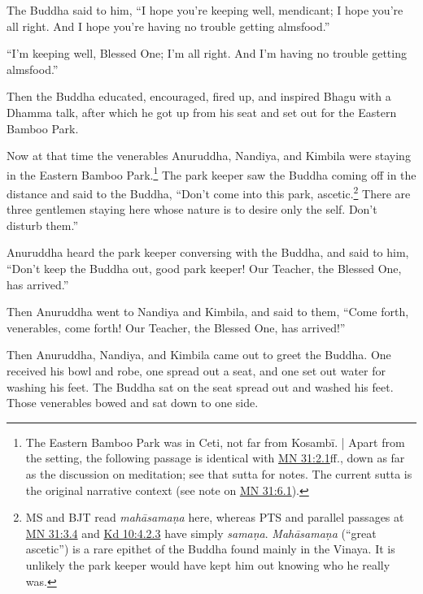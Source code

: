 \documentclass[12pt,openany]{book}%
\begin{document}
The Buddha said to him, “I hope you’re keeping well, mendicant; I hope you’re all right. And I hope you’re having no trouble getting almsfood.” 

“I’m keeping well, Blessed One; I’m all right. And I’m having no trouble getting almsfood.” 

Then the Buddha educated, encouraged, fired up, and inspired Bhagu with a Dhamma talk, after which he got up from his seat and set out for the Eastern Bamboo Park. 

Now at that time the venerables Anuruddha, Nandiya, and Kimbila were staying in the Eastern Bamboo Park.\footnote{The Eastern Bamboo Park was in Ceti, not far from \textsanskrit{Kosambī}. | Apart from the setting, the following passage is identical with \href{https://suttacentral.net/mn31/en/sujato\#2.1}{MN 31:2.1}ff., down as far as the discussion on meditation; see that sutta for notes. The current sutta is the original narrative context (see note on \href{https://suttacentral.net/mn31/en/sujato\#6.1}{MN 31:6.1}). } The park keeper saw the Buddha coming off in the distance and said to the Buddha, “Don’t come into this park, ascetic.\footnote{MS and BJT read \textit{\textsanskrit{mahāsamaṇa}} here, whereas PTS and parallel passages at \href{https://suttacentral.net/mn31/en/sujato\#3.4}{MN 31:3.4} and \href{https://suttacentral.net/pli-tv-kd10/en/sujato\#4.2.3}{Kd 10:4.2.3} have simply \textit{\textsanskrit{samaṇa}}. \textit{\textsanskrit{Mahāsamaṇa}} (“great ascetic”) is a rare epithet of the Buddha found mainly in the Vinaya. It is unlikely the park keeper would have kept him out knowing who he really was. } There are three gentlemen staying here whose nature is to desire only the self. Don’t disturb them.” 

Anuruddha heard the park keeper conversing with the Buddha, and said to him, “Don’t keep the Buddha out, good park keeper! Our Teacher, the Blessed One, has arrived.” 

Then Anuruddha went to Nandiya and Kimbila, and said to them, “Come forth, venerables, come forth! Our Teacher, the Blessed One, has arrived!” 

Then Anuruddha, Nandiya, and Kimbila came out to greet the Buddha. One received his bowl and robe, one spread out a seat, and one set out water for washing his feet. The Buddha sat on the seat spread out and washed his feet. Those venerables bowed and sat down to one side. 
\end{document}
